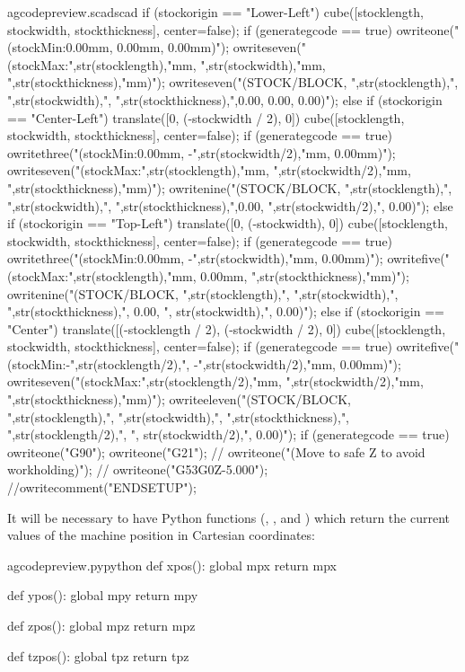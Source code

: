 \documentclass{ltxdoc}
\begin{document}
\begin{writecode}{a}{gcodepreview.scad}{scad}
{{    if (stockorigin == "Lower-Left") {
    cube([stocklength, stockwidth, stockthickness], center=false);
if (generategcode == true) {
owriteone("(stockMin:0.00mm, 0.00mm, 0.00mm)");
owriteseven("(stockMax:",str(stocklength),"mm, ",str(stockwidth),"mm, ",str(stockthickness),"mm)");
owriteseven("(STOCK/BLOCK, ",str(stocklength),", ",str(stockwidth),", ",str(stockthickness),",0.00, 0.00, 0.00)");
    }
}    else if (stockorigin == "Center-Left") {
    translate([0, (-stockwidth / 2), 0]){
      cube([stocklength, stockwidth, stockthickness], center=false);
if (generategcode == true) {
owritethree("(stockMin:0.00mm, -",str(stockwidth/2),"mm, 0.00mm)");
owriteseven("(stockMax:",str(stocklength),"mm, ",str(stockwidth/2),"mm, ",str(stockthickness),"mm)");
owritenine("(STOCK/BLOCK, ",str(stocklength),", ",str(stockwidth),", ",str(stockthickness),",0.00, ",str(stockwidth/2),", 0.00)");
    }
  } 
    } else if (stockorigin == "Top-Left") {
    translate([0, (-stockwidth), 0]){
      cube([stocklength, stockwidth, stockthickness], center=false);
    }
if (generategcode == true) {
owritethree("(stockMin:0.00mm, -",str(stockwidth),"mm, 0.00mm)");
owritefive("(stockMax:",str(stocklength),"mm, 0.00mm, ",str(stockthickness),"mm)");
owritenine("(STOCK/BLOCK, ",str(stocklength),", ",str(stockwidth),", ",str(stockthickness),", 0.00, ", str(stockwidth),", 0.00)");
  }
}    else if (stockorigin == "Center") {
    translate([(-stocklength / 2), (-stockwidth / 2), 0]){
      cube([stocklength, stockwidth, stockthickness], center=false);
    }
if (generategcode == true) {
owritefive("(stockMin:-",str(stocklength/2),", -",str(stockwidth/2),"mm, 0.00mm)");
owriteseven("(stockMax:",str(stocklength/2),"mm, ",str(stockwidth/2),"mm, ",str(stockthickness),"mm)");
owriteeleven("(STOCK/BLOCK, ",str(stocklength),", ",str(stockwidth),", ",str(stockthickness),", ",str(stocklength/2),", ", str(stockwidth/2),", 0.00)");
    }
  }
}
if (generategcode == true) {
    owriteone("G90");
    owriteone("G21");
//    owriteone("(Move to safe Z to avoid workholding)");
//    owriteone("G53G0Z-5.000");
  }
//owritecomment("ENDSETUP");
}

\end{writecode}
\addtocounter{gcpscad}{93}

It will be necessary to have Python functions (, , 
and ) which return the current values of the machine position in 
Cartesian coordinates: 

\lstset{firstnumber=\thegcpy}
\begin{writecode}{a}{gcodepreview.py}{python}
def xpos():
    global mpx
    return mpx

def ypos():
    global mpy
    return mpy

def zpos():
    global mpz
    return mpz

def tzpos():
    global tpz
    return tpz

\end{writecode}
\addtocounter{gcpy}{16}
\end{document}
